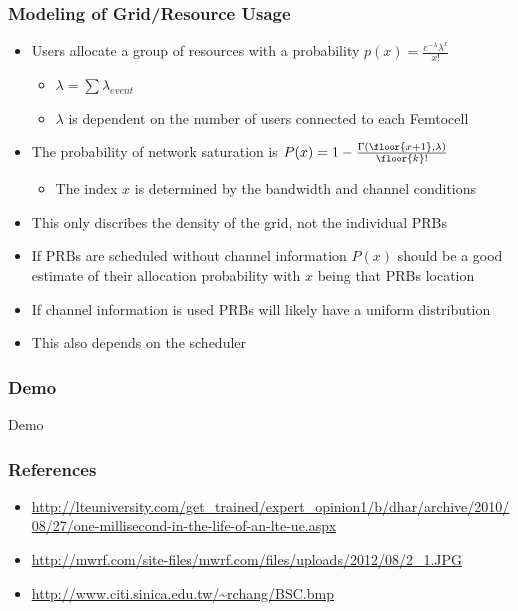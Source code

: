 \documentclass{beamer}
\begin{document}
\begin{frame}
\frametitle{Modeling of Grid/Resource Usage}
\begin{itemize}
  \item Users allocate a group of resources with a probability $p\left( x \right) = \frac{{e^{ - \lambda } \lambda ^x }}{{x!}}$
  \begin{itemize}
    \item $\lambda = \sum\lambda_{event}$
    \item $\lambda$ is dependent on the number of users connected to each Femtocell
  \end{itemize}
  \item The probability of network saturation is $P(x) = 1 - \frac{\Gamma (\floor{x+1},\lambda)}{\floor{k}!}$
  \begin{itemize}
    \item The index $x$ is determined by the bandwidth and channel conditions
  \end{itemize}
  \item This only discribes the density of the grid, not the individual PRBs
  \item If PRBs are scheduled without channel information $P(x)$ should be a good estimate of their allocation probability with $x$ being that PRBs location
  \item If channel information is used PRBs will likely have a uniform distribution
  \item This also depends on the scheduler
\end{itemize}
\end{frame}


\begin{frame}
\frametitle{Demo}
\Huge{\centerline{Demo}}
\end{frame}


\begin{frame}
\frametitle{References}
\begin{itemize}
\item \url{http://lteuniversity.com/get_trained/expert_opinion1/b/dhar/archive/2010/08/27/one-millisecond-in-the-life-of-an-lte-ue.aspx}
\item \url{http://mwrf.com/site-files/mwrf.com/files/uploads/2012/08/2_1.JPG}
\item \url{http://www.citi.sinica.edu.tw/~rchang/BSC.bmp}
\end{itemize}
\end{frame}

\end{document}
